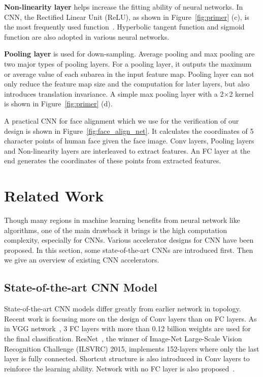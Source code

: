 \documentclass[10pt, conference, compsocconf]{IEEEtran}
\begin{document}
\textbf{Non-linearity layer} helps increase the fitting ability of neural networks. In CNN, the Rectified Linear Unit (ReLU), as shown in Figure~\ref{fig:primer} (c), is the most frequently used function~\cite{krizhevsky2012imagenet}. Hyperbolic tangent function and sigmoid function are also adopted in various neural networks.

\textbf{Pooling layer} is used for down-sampling. Average pooling and max pooling are two major types of pooling layers. For a pooling layer, it outputs the maximum or average value of each subarea in the input feature map. Pooling layer can not only reduce the feature map size and the computation for later layers, but also introduces translation invariance. A simple max pooling layer with a 2$\times$2 kernel is shown in Figure~\ref{fig:primer} (d).

A practical CNN for face alignment which we use for the verification of our design is shown in Figure~\ref{fig:face_align_net}. It calculates the coordinates of 5 character points of human face given the face image. Conv layers, Pooling layers and Non-linearity layers are interleaved to extract features. An FC layer at the end generates the coordinates of these points from extracted features.

\section{Related Work} \label{sec:related_work}
Though many regions in machine learning benefits from neural network like algorithms, one of the main drawback it brings is the high computation complexity, especially for CNNs. Various accelerator designs for CNN have been proposed. In this section, some state-of-the-art CNNs are introduced first. Then we give an overview of existing CNN accelerators.

\subsection{State-of-the-art CNN Model}
State-of-the-art CNN models differ greatly from earlier network in topology. Recent work is focusing more on the design of Conv layers than on FC layers. As in VGG network~\cite{simonyan2014very}, 3 FC layers with more than 0.12 billion weights are used for the final classification. ResNet~\cite{he2015deep}, the winner of Image-Net Large-Scale Vision Recognition Challenge (ILSVRC) 2015, implements 152-layers where only the last layer is fully connected. Shortcut structure is also introduced in Conv layers to reinforce the learning ability. Network with no FC layer is also proposed~\cite{long2015fully}.
\end{document}
